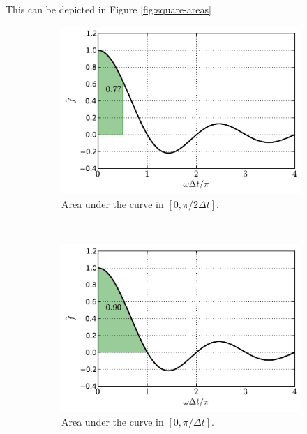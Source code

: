 \documentclass[12pt,letterpaper]{article}
\begin{document}
{This can be depicted in Figure \ref{fig:square-areas}
\begin{figure}[H]
    \centering
    \begin{subfigure}[b]{0.45\textwidth}
        \includegraphics[width=\textwidth]{img/square_area=1.pdf}
        \caption{Area under the curve in $[0,\pi/2\Delta t]$.}
    \end{subfigure}\
    \begin{subfigure}[b]{0.45\textwidth}
        \includegraphics[width=\textwidth]{img/square_area=2.pdf}
        \caption{Area under the curve in $[0,\pi/\Delta t]$.}
    \end{subfigure}\\
    \begin{subfigure}[b]{0.45\textwidth}

\end{subfigure}
\end{figure}}
\end{document}
